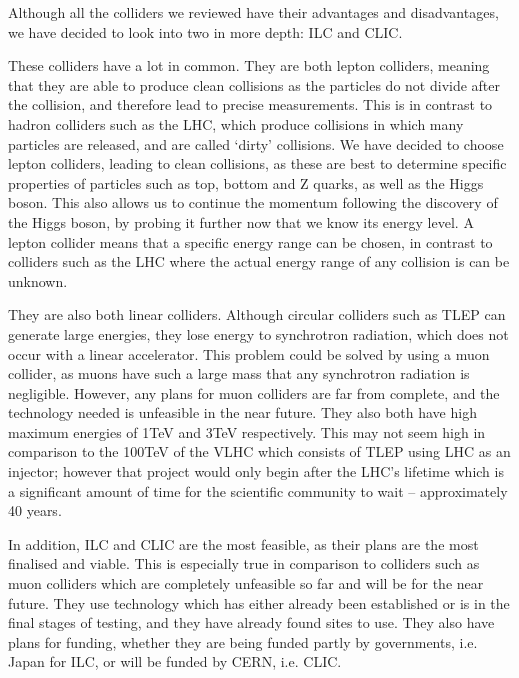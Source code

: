 Although all the colliders we reviewed have their advantages and disadvantages, we have decided to look into two in more depth: ILC and CLIC. 

These colliders have a lot in common. They are both lepton colliders, meaning that they are able to produce clean collisions as the particles do not divide after the collision, and therefore lead to precise measurements. This is in contrast to hadron colliders such as the LHC, which produce collisions in which many particles are released, and are called ‘dirty’ collisions. We have decided to choose lepton colliders, leading to clean collisions, as these are best to determine specific properties of particles such as top, bottom and Z quarks, as well as the Higgs boson. This also allows us to continue the momentum following the discovery of the Higgs boson, by probing it further now that we know its energy level. A lepton collider means that a specific energy range can be chosen, in contrast to colliders such as the LHC where the actual energy range of any collision is can be unknown.

They are also both linear colliders. Although circular colliders such as TLEP can generate large energies, they lose energy to synchrotron radiation, which does not occur with a linear accelerator. This problem could be solved by using a muon collider, as muons have such a large mass that any synchrotron radiation is negligible. However, any plans for muon colliders are far from complete, and the technology needed is unfeasible in the near future. They also both have high maximum energies of 1TeV and 3TeV respectively. This may not seem high in comparison to the 100TeV of the VLHC which consists of TLEP using LHC as an injector; however that project would only begin after the LHC’s lifetime which is a significant amount of time for the scientific community to wait – approximately 40 years.

In addition, ILC and CLIC are the most feasible, as their plans are the most finalised and viable. This is especially true in comparison to colliders such as muon colliders which are completely unfeasible so far and will be for the near future. They use technology which has either already been established or is in the final stages of testing, and they have already found sites to use. They also have plans for funding, whether they are being funded partly by governments, i.e. Japan for ILC, or will be funded by CERN, i.e. CLIC.